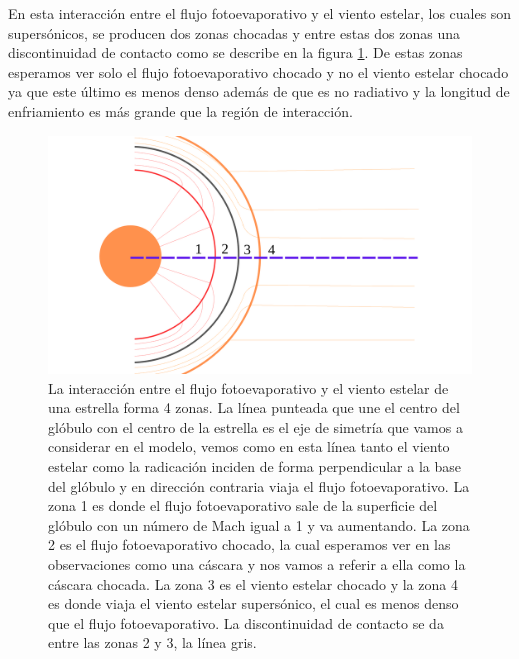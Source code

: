 \documentclass{book}
\begin{document}
En esta interacción entre el flujo fotoevaporativo y el viento estelar, los cuales son supersónicos, se producen dos zonas chocadas y entre estas dos zonas una discontinuidad de contacto como se describe en la figura \ref{fig:zones}. De estas zonas esperamos ver solo el flujo fotoevaporativo chocado y no el viento estelar chocado ya que este último es menos denso además de que es no radiativo y la longitud de enfriamiento es más grande que la región de interacción.

\begin{figure}[htb]
    \centering    \includegraphics[width=\textwidth]{Nuevas imagenes finales/C2_zone_new.pdf}
    \caption{La interacción entre el flujo fotoevaporativo y el viento estelar de una estrella forma 4 zonas. La línea punteada que une el centro del  glóbulo con el centro de la estrella es el eje de simetría que vamos a considerar en el modelo, vemos como en esta línea tanto el viento estelar como la radicación inciden de forma perpendicular a la base del glóbulo y en dirección contraria viaja el flujo fotoevaporativo. La zona 1 es donde el flujo fotoevaporativo sale de la superficie del glóbulo con un número de Mach igual a 1 y va aumentando. La zona 2 es el flujo fotoevaporativo chocado, la cual esperamos ver en las observaciones como una cáscara y nos vamos a referir a ella como la cáscara chocada. La zona 3 es el viento estelar chocado y la zona 4 es donde viaja el viento estelar supersónico, el cual es menos denso que el flujo fotoevaporativo. La discontinuidad de contacto se da entre las zonas 2 y 3, la línea gris.}
    \label{fig:zones}
\end{figure}
\end{document}
